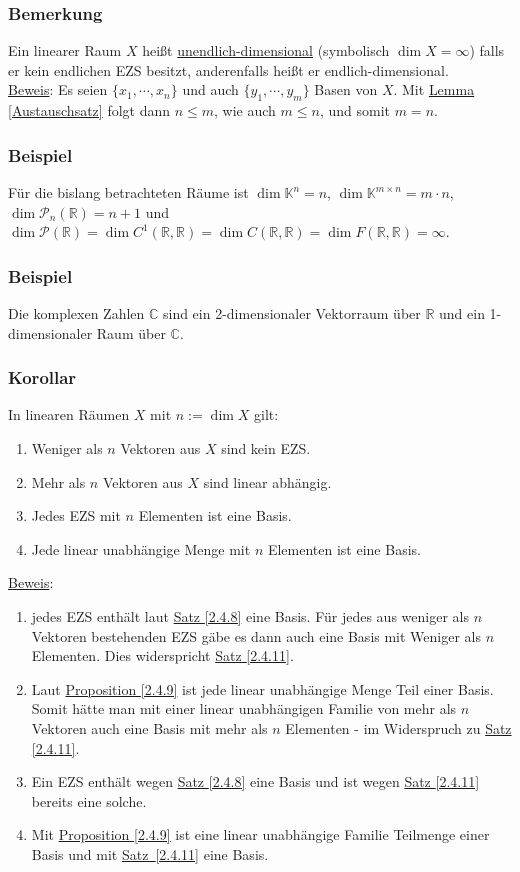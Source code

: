 \subsubsection{Bemerkung}
Ein linearer Raum $X$ heißt \underline{unendlich-dimensional} (symbolisch $\dim X=\infty$) falls er kein endlichen EZS besitzt, anderenfalls heißt er endlich-dimensional.\\
\underline{Beweis}: Es seien $\{x_1,\cdots ,x_n\}$ und auch $\{y_1,\cdots ,y_m\}$ Basen von $X$.  Mit \hyperref[Austauschsatz]{Lemma \ref*{Austauschsatz}} folgt dann $n\leq m$, wie auch $m\leq n$, und somit $m=n$.
\subsubsection{Beispiel}
Für die bislang betrachteten Räume ist $\dim \mathbb{K}^n=n$, $\dim \mathbb{K}^{m\times n}=m\cdot n$, $\dim \mathcal{P}_n(\mathbb{R})=n+1$ und $\dim \mathcal{P}(\mathbb{R})=\dim C^1(\mathbb{R},\mathbb{R})=\dim C(\mathbb{R},\mathbb{R})=\dim F(\mathbb{R},\mathbb{R})=\infty$.
\subsubsection{Beispiel}
Die komplexen Zahlen $\mathbb{C}$ sind ein 2-dimensionaler Vektorraum über $\mathbb{R}$ und ein 1-dimensionaler Raum über $\mathbb{C}$.
\subsubsection{Korollar}
\label{2.4.15}
In linearen Räumen $X$ mit $n:=\dim X$ gilt:
\begin{enumerate}
\item Weniger als $n$ Vektoren aus $X$ sind kein EZS.
\item Mehr als $n$ Vektoren aus $X$ sind linear abhängig.
\item Jedes EZS mit $n$ Elementen ist eine Basis.
\item Jede linear unabhängige Menge mit $n$ Elementen ist eine Basis.
\end{enumerate}
\underline{Beweis}: 
\begin{enumerate}
\item jedes EZS enthält laut \hyperref[2.4.8]{Satz \ref*{2.4.8}} eine Basis.  Für jedes aus weniger als $n$ Vektoren bestehenden EZS gäbe es dann auch eine Basis mit Weniger als $n$ Elementen.  Dies widerspricht \hyperref[2.4.11]{Satz \ref*{2.4.11}}.
\item Laut \hyperref[2.4.9]{Proposition \ref*{2.4.9}} ist jede linear unabhängige Menge Teil einer Basis.  Somit hätte man mit einer linear unabhängigen Familie von mehr als $n$ Vektoren auch eine Basis mit mehr als $n$ Elementen - im Widerspruch zu \hyperref[2.4.11]{Satz \ref*{2.4.11}}.
\item Ein EZS enthält wegen \hyperref[2.4.8]{Satz \ref*{2.4.8}} eine Basis und ist wegen \hyperref[2.4.11]{Satz \ref*{2.4.11}} bereits eine solche.
\item Mit \hyperref[2.4.9]{Proposition \ref*{2.4.9}} ist eine linear unabhängige Familie Teilmenge einer Basis und mit \hyperref[2.4.11]{Satz~\ref*{2.4.11}} eine Basis.
\end{enumerate}
